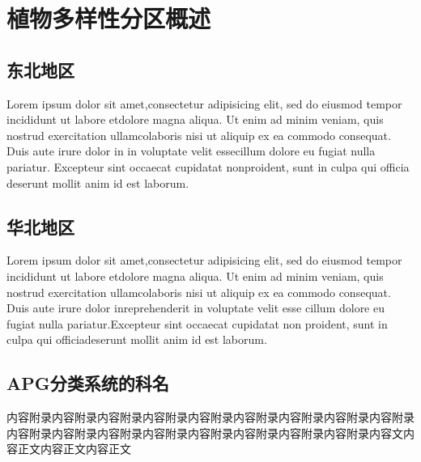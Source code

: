 \documentclass[utf8]{book}
\begin{document}
\part{植物多样性分区概述}

\chapter{东北地区}

\begin{multicols}{2}

Lorem ipsum dolor sit amet,consectetur adipisicing elit, sed do eiusmod tempor incididunt ut labore etdolore magna aliqua. Ut enim ad minim veniam, quis nostrud exercitation ullamcolaboris nisi ut aliquip ex ea commodo consequat. Duis aute irure dolor in  in voluptate velit essecillum dolore eu fugiat nulla pariatur. Excepteur sint occaecat cupidatat nonproident, sunt in culpa qui officia deserunt mollit anim id est laborum.

\end{multicols}

\chapter{华北地区}

\begin{multicols}{2}

Lorem ipsum dolor sit amet,consectetur adipisicing elit, sed do eiusmod tempor incididunt ut labore etdolore magna aliqua. Ut enim ad minim veniam, quis nostrud exercitation ullamcolaboris nisi ut aliquip ex ea commodo consequat. Duis aute irure dolor inreprehenderit in voluptate velit esse cillum dolore eu fugiat nulla pariatur.Excepteur sint occaecat cupidatat non proident, sunt in culpa qui officiadeserunt mollit anim id est laborum.

\end{multicols}



\appendix

\chapter{APG分类系统的科名}

内容附录内容附录内容附录内容附录内容附录内容附录内容附录内容附录内容附录内容附录内容附录内容附录内容附录内容附录内容附录内容附录内容附录内容文内容正文内容正文内容正文
\end{document}
